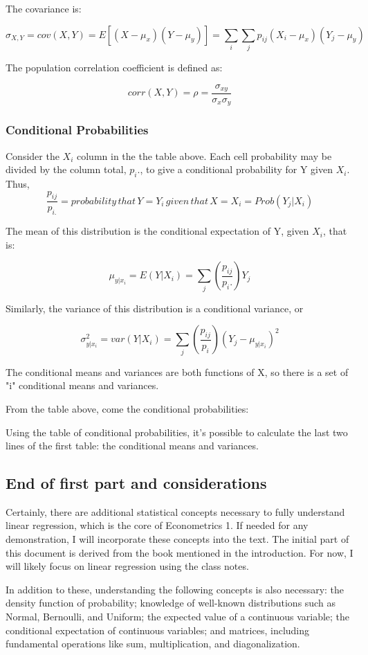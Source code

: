 \documentclass{article} %
\begin{document}
The covariance is: 

\[\sigma_{X,Y}=cov(X,Y)=E[(X-\mu_x)(Y-\mu_y)]=\displaystyle\sum_{i}\displaystyle\sum_{j}p_{ij}(X_i-\mu_x)(Y_j-\mu_y)\]

The population correlation coefficient is defined as:


\[corr(X,Y)=\rho=\frac{\sigma_{xy}}{\sigma_x\sigma_y}\]

\subsubsection{Conditional Probabilities}
Consider the \(X_i\) column in the the table above. Each cell probability may be divided by the column total, \(p_i.\), to give a conditional probability for Y given \(X_i\). Thus,
\[\frac{p_{ij}}{p_{i.}}=probability\,that\,Y = Y_i\,given\,that\, X = X_i = Prob(Y_j|X_i)\]

The mean of this distribution is the conditional expectation of Y, given \(X_i\), that is:

\[\mu_{y|x_i}=E(Y|X_i)=\sum_{j}(\frac{p_{ij}}{p_i.})Y_j\]

Similarly, the variance of this distribution is a conditional variance, or

\[\sigma^2_{y|x_i}=var(Y|X_i)=\sum_{j}(\frac{p_{ij}}{p_i})(Y_j-\mu_{y|x_i})^2\]


The conditional means and variances are both functions of X, so there is a set of "i" conditional means and variances. 


From the table above, come the conditional probabilities:


Using the table of conditional probabilities, it's possible to calculate the last two lines of the first table: the conditional means and variances.
\subsection{End of first part and considerations}
Certainly, there are additional statistical concepts necessary to fully understand linear regression, which is the core of Econometrics 1. If needed for any demonstration, I will incorporate these concepts into the text. The initial part of this document is derived from the book mentioned in the introduction. For now, I will likely focus on linear regression using the class notes.

In addition to these, understanding the following concepts is also necessary: the density function of probability; knowledge of well-known distributions such as Normal, Bernoulli, and Uniform; the expected value of a continuous variable; the conditional expectation of continuous variables; and matrices, including fundamental operations like sum, multiplication, and diagonalization.
\end{document}
